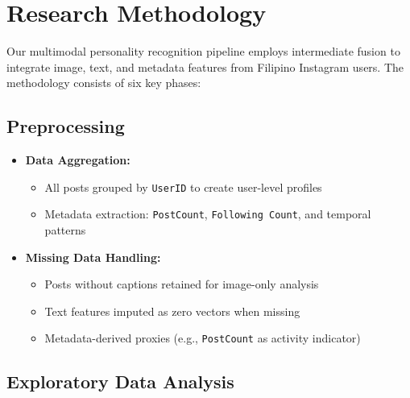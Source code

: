 

%
%
\section{Research Methodology}
\label{sec:methodology}


Our multimodal personality recognition pipeline employs intermediate fusion to integrate image, text, and metadata features from Filipino Instagram users. The methodology consists of six key phases:

\subsection{Preprocessing}
\label{subsec:preprocessing}

\begin{itemize}
	\item \textbf{Data Aggregation:} 
	\begin{itemize}
		\item All posts grouped by \texttt{UserID} to create user-level profiles
		\item Metadata extraction: \texttt{PostCount}, \texttt{Following Count}, and temporal patterns
	\end{itemize}
	
	\item \textbf{Missing Data Handling:}
	\begin{itemize}
		\item Posts without captions retained for image-only analysis
		\item Text features imputed as zero vectors when missing
		\item Metadata-derived proxies (e.g., \texttt{PostCount} as activity indicator)
	\end{itemize}
\end{itemize}

\subsection{Exploratory Data Analysis}
\label{subsec:eda}

